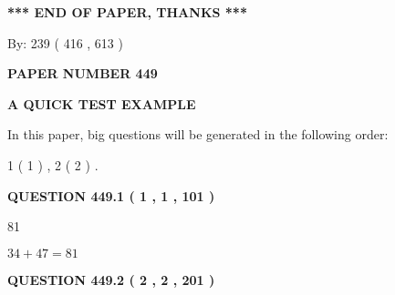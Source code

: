 \documentclass[12pt]{article}
\begin{document}
   
   
   
   
\vspace{1.0in} 
{\textbf{\large{ *** END OF PAPER, THANKS *** }}} 
   
   
\hspace{1.0in} By: 
 239 ( 416 ,  613 )
   
   
   
   
\newpage 
\setcounter{page}{ 
   449001 } 
   
   
   
   
 {\textbf{ \Large{ PAPER NUMBER  449  }}}
   
   
\vspace{0.2in}
   
   
   
   
   
   
 \vspace{0.2in}
{\LARGE {\textbf{ A QUICK TEST EXAMPLE}}}
   
   
   
\vspace{0.2in}
   
In this paper, big questions will be generated in the following order: 
   
   
   1 ( 1 )
 ,
   2 ( 2 )
 .
  
\vspace{0.2in}
  
{\textbf{\Large{QUESTION
449.1 
 ( 1 , 1 , 101 )
}}}
  
  
 
 
\noindent{}

81
 
 
 
 
\noindent{}

$ %
34 +  %
47=   %
81$
 
 
  
\vspace{0.2in}
  
{\textbf{\Large{QUESTION
449.2 
 ( 2 , 2 , 201 )
}}}
  
  
 
 
\noindent{}
 
\end{document}
